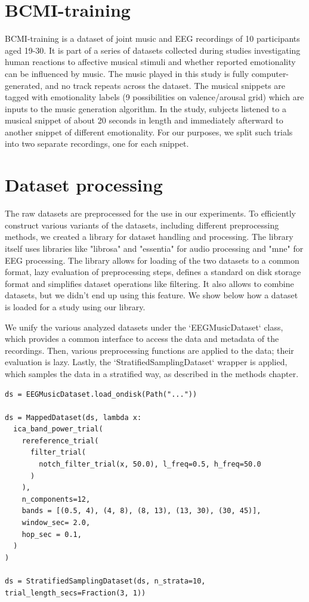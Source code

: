 \section{BCMI-training}

BCMI-training is a dataset of joint music and EEG recordings of 10 participants aged 19-30.
It is part of a series of datasets collected during studies investigating human reactions to affective musical stimuli and whether reported emotionality can be influenced by music\cite{nicolaou}.
The music played in this study is fully computer-generated, and no track repeats across the dataset.
The musical snippets are tagged with emotionality labels (9 possibilities on valence/arousal grid) which are inputs to the music generation algorithm.
In the study, subjects listened to a musical snippet of about 20 seconds in length and immediately afterward to another snippet of different emotionality.
For our purposes, we split such trials into two separate recordings, one for each snippet.

\section{Dataset processing}

The raw datasets are preprocessed for the use in our experiments.
To efficiently construct various variants of the datasets, including different preprocessing methods, we created a library for dataset handling and processing.
The library itself uses libraries like "librosa" and "essentia" for audio processing and "mne" for EEG processing.
The library allows for loading of the two datasets to a common format, lazy evaluation of preprocessing steps, defines a standard on disk storage format and simplifies dataset operations like filtering. 
It also allows to combine datasets, but we didn't end up using this feature.
We show below how a dataset is loaded for a study using our library.

We unify the various analyzed datasets under the `EEGMusicDataset` class, which provides a common interface to access the data and metadata of the recordings.
Then, various preprocessing functions are applied to the data; their evaluation is lazy.
Lastly, the `StratifiedSamplingDataset` wrapper is applied, which samples the data in a stratified way, as described in the methods chapter.

\begin{verbatim}
ds = EEGMusicDataset.load_ondisk(Path("..."))

ds = MappedDataset(ds, lambda x: 
  ica_band_power_trial(
    rereference_trial(
      filter_trial(
        notch_filter_trial(x, 50.0), l_freq=0.5, h_freq=50.0
      )
    ),
    n_components=12,
    bands = [(0.5, 4), (4, 8), (8, 13), (13, 30), (30, 45)],
    window_sec= 2.0,
    hop_sec = 0.1,
  )
)

ds = StratifiedSamplingDataset(ds, n_strata=10, trial_length_secs=Fraction(3, 1))

\end{verbatim}



